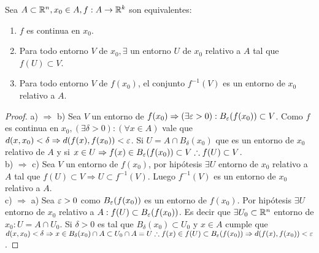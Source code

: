 \begin{prop}
  Sea \(A \subset \mathbb{R}^n, x_0 \in A, f: A \to \mathbb{R}^k\) son equivalentes:
  \begin{enumerate}
    \item \(f\) es continua en \(x_0\).
    \item Para todo entorno \(V\) de \(x_0, \exists\) un entorno \(U\) de \(x_0\) relativo a \(A\) tal que \(f(U) \subset V\).
    \item Para todo entorno \(V\) de \(f(x_0)\), el conjunto \(f^{-1}(V)\) es un entorno de \(x_0\) relativo a \(A\).
  \end{enumerate}

  \begin{proof}
    a) \(\Rightarrow\) b) Sea \(V\) un entorno de \(f(x_0) \Rightarrow (\exists \varepsilon > 0) : B_{\varepsilon}(f(x_0)) \subset V\). Como \(f\) es continua en \(x_0, (\exists \delta > 0) : (\forall x \in A)\) vale que \(d(x, x_0) < \delta \Rightarrow d(f(x), f(x_0)) < \varepsilon\). Si \(U = A \cap B_{\delta}(x_0)\) que es un entorno de \(x_0\) relativo de \(A\) y si \(x \in U \Rightarrow f(x) \in B_{\varepsilon}(f(x_0)) \subset V \therefore f(U) \subset V\). \\
    b) \(\Rightarrow\) c) Sea \(V\) un entorno de \(f(x_0)\), por hipótesis \(\exists U\) entorno de \(x_0\) relativo a \(A\) tal que \(f(U) \subset V \Rightarrow U \subset f^{-1}(V)\). Luego \(f^{-1}(V)\) es un entorno de \(x_0\) relativo a \(A\). \\
    c) \(\Rightarrow\) a) Sea \(\varepsilon > 0\) como \(B_{\varepsilon}(f(x_0))\) es un entorno de \(f(x_0)\). Por hipótesis \(\exists U\) entorno de \(x_0\) relativo a \(A : f(U) \subset B_{\varepsilon}(f(x_0))\). Es decir que \(\exists U_0 \subset \mathbb{R}^n\) entorno de \(x_0 : U = A \cap U_0\). Si \(\delta > 0\) es tal que \(B_{\delta}(x_0) \subset U_0\) y \(x \in A\) cumple que \(d(x, x_0) < \delta \Rightarrow x \in B_{\delta}(x_0) \cap A \subset U_0 \cap A = U \therefore f(x) \in f(U) \subset B_{\varepsilon}(f(x_0))  \Rightarrow d(f(x), f(x_0)) < \varepsilon\).
  \end{proof}
\end{prop}

